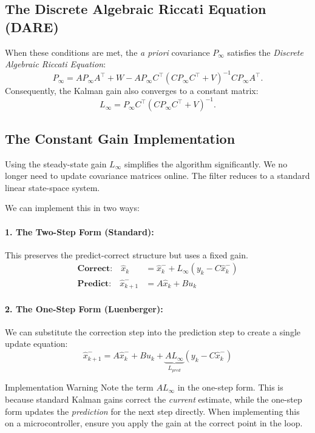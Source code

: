 \subsection{The Discrete Algebraic Riccati Equation (DARE)}
When these conditions are met, the \textit{a priori} covariance $P_{\infty}$ satisfies the \emph{Discrete Algebraic Riccati Equation}:
\begin{equation*}
	P_\infty = A P_\infty A^\top + W 
	- A P_\infty C^\top (C P_\infty C^\top + V)^{-1} C P_\infty A^\top.
\end{equation*}
Consequently, the Kalman gain also converges to a constant matrix:
\begin{equation*}
	L_\infty = P_\infty C^\top (C P_\infty C^\top + V)^{-1}.
\end{equation*}

\subsection{The Constant Gain Implementation}
Using the steady-state gain $L_\infty$ simplifies the algorithm significantly. We no longer need to update covariance matrices online. The filter reduces to a standard linear state-space system.

We can implement this in two ways:

\paragraph{1. The Two-Step Form (Standard):}
This preserves the predict-correct structure but uses a fixed gain.
\begin{align*}
	\textbf{Correct:} \quad \hat{x}_k &= \hat{x}_k^- + L_\infty (y_k - C \hat{x}_k^-) \\
	\textbf{Predict:} \quad \hat{x}_{k+1}^- &= A \hat{x}_k + B u_k
\end{align*}

\paragraph{2. The One-Step Form (Luenberger):}
We can substitute the correction step into the prediction step to create a single update equation:
\begin{equation*}
	\hat{x}_{k+1}^- = A \hat{x}_k^- + B u_k + \underbrace{A L_\infty}_{L_{pred}} (y_k - C \hat{x}_k^-)
\end{equation*}
\begin{notebox}{Implementation Warning}
	Note the term $A L_\infty$ in the one-step form. This is because standard Kalman gains correct the \textit{current} estimate, while the one-step form updates the \textit{prediction} for the next step directly. When implementing this on a microcontroller, ensure you apply the gain at the correct point in the loop.
\end{notebox}

